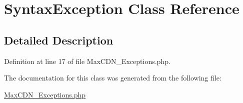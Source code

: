 \hypertarget{class_syntax_exception}{
\section{SyntaxException Class Reference}
\label{class_syntax_exception}
}


\subsection{Detailed Description}


Definition at line 17 of file MaxCDN\_\-Exceptions.php.



The documentation for this class was generated from the following file:\begin{DoxyCompactItemize}
\item 
\hyperlink{_max_c_d_n___exceptions_8php}{MaxCDN\_\-Exceptions.php}\end{DoxyCompactItemize}
